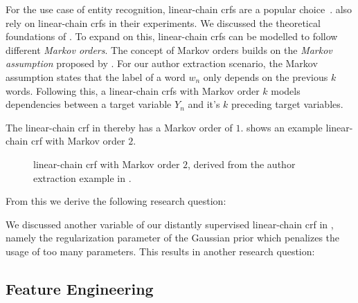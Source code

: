 For the use case of entity recognition, \glspl{linear-chain crf} are a popular choice~\citep{peng2004accurate,mann2008generalized,ling2012fine,groza2012reference,ohta2014empirical}.
\citet{lu2013web} also rely on \glspl{linear-chain crf} in their experiments.
We discussed the theoretical foundations of .
To expand on this, \glspl{linear-chain crf} can be modelled to follow different \textit{Markov orders}.
The concept of Markov orders builds on the \textit{Markov assumption} proposed by \citet{markov1957theory}.
For our author extraction scenario, the Markov assumption states that the label of a word $w_n$ only depends on the previous $k$ words.
Following this, a \glspl{linear-chain crf} with Markov order $k$ models dependencies between a \gls{target variable} $Y_n$ and it's $k$ preceding \glspl{target variable}.

The \gls{linear-chain crf} in  thereby has a Markov order of $1$.
 shows an example \gls{linear-chain crf} with Markov order $2$.
\begin{figure}[t]
\centering

\caption{%
  \Gls{linear-chain crf} with Markov order $2$, derived from the author extraction example in .}
\label{fig:example-linear-chain-crf-markov-order-2}
\end{figure}

From this we derive the following research question:
\newcommand\researchquestionseven{}
\researchquestionseven%

We discussed another variable of our distantly supervised \gls{linear-chain crf} in , namely the regularization parameter of the Gaussian prior which penalizes the usage of too many parameters.
This results in another research question:
\newcommand\researchquestioneight{}
\researchquestioneight%

\subsection{Feature Engineering}\label{subsec:ae-feature-engineering}

